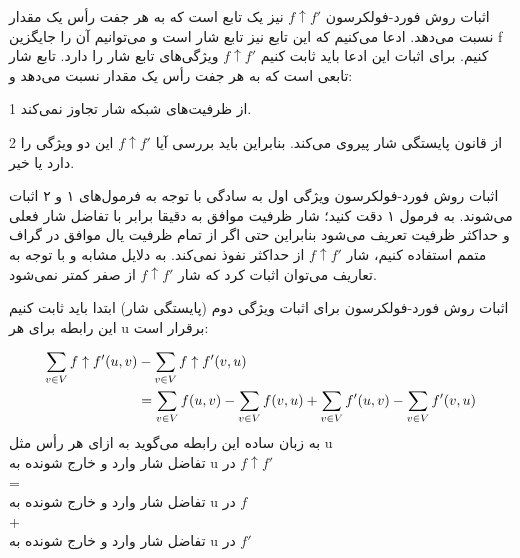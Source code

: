 \begin{itemframe}{اثبات روش فورد-فولکرسون}
\itm
$f \uparrow f'$
نیز یک تابع است که به هر جفت رأس یک مقدار نسبت می‌دهد. ادعا می‌کنیم که این تابع نیز تابع شار است و می‌توانیم آن را جایگزین f کنیم. برای اثبات این ادعا باید ثابت کنیم
$f \uparrow f'$
ویژگی‌های تابع شار را دارد. تابع شار تابعی است که به هر جفت رأس یک مقدار نسبت می‌دهد و:
\item[1]
از ظرفیت‌های شبکه شار تجاوز نمی‌کند.
\item[2]
از قانون پایستگی شار پیروی می‌کند.
\itm
بنابراین باید بررسی آیا
$f \uparrow f'$
این دو ویژگی را دارد یا خیر.
\end{itemframe}

\begin{itemframe}{اثبات روش فورد-فولکرسون}
\itm
ویژگی اول به سادگی با توجه به فرمول‌های ۱ و ۲ اثبات می‌شوند. به فرمول ۱ دقت کنید‍؛ شار ظرفیت موافق به دقیقا برابر با تفاضل شار فعلی و حداکثر ظرفیت تعریف می‌شود بنابراین حتی اگر از تمام ظرفیت یال موافق در گراف متمم استفاده کنیم، شار
$f \uparrow f'$
از حداکثر نفوذ نمی‌کند.
\itm
به دلایل مشابه و با توجه به تعاریف می‌توان اثبات کرد که شار
$f \uparrow f'$
از صفر کمتر نمی‌شود.
\end{itemframe}
\begin{itemframe}{اثبات روش فورد-فولکرسون}
\itm
برای اثبات ویژگی دوم (پایستگی شار) ابتدا باید ثابت کنیم این رابطه برای هر u برقرار است:

\begin{align}
\sum_{v\in V} f \uparrow f'(u, v)  & - \sum_{v\in V} f \uparrow f'(v, u) \notag \\
&=
 \sum_{v\in V} f(u, v) - \sum_{v\in V} f (v, u)
+
\sum_{v\in V} f'(u, v) - \sum_{v\in V} f'(v, u)
\label{cons}
\end{align}
\itm
به زبان ساده این رابطه می‌گوید به ازای هر رأس مثل u\\
تفاضل شار وارد و خارج شونده به u در
$ f \uparrow f'$ \\
=\\
تفاضل شار وارد و خارج شونده به u در
$f$ \\
+\\
تفاضل شار وارد و خارج شونده به u در
$f'$\\


\end{itemframe}

